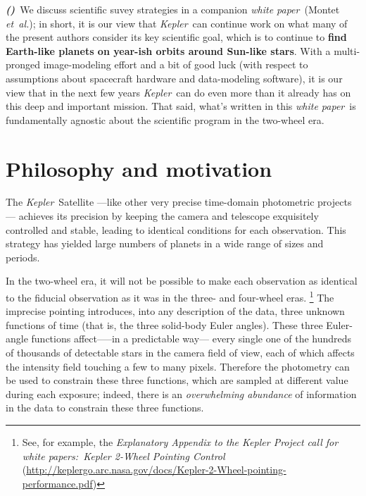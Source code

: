 \documentclass[letterpaper,12pt,whitepaper]{haastex}
\newcommand{\documentname}{\textsl{white paper}}
\newcommand{\foreign}[1]{\textit{#1}}
\newcommand{\etal}{\foreign{et~al.}}
\newcommand{\observatory}[1]{\textsl{#1}}
\newcommand{\Kepler}{\observatory{Kepler}}
\newcounter{inlineitem}
\newcommand{\binlineitem}{\refstepcounter{inlineitem}\textbf{\textsl{(\theinlineitem)}}}
\begin{document}
\binlineitem~We discuss scientific suvey strategies in a companion \documentname\ (Montet \etal);
  in short, it is our view that \Kepler\ can continue work on
  what many of the present authors consider its key scientific goal,
  which is to continue to \textbf{find Earth-like planets on year-ish orbits around Sun-like stars}.
With a multi-pronged image-modeling effort and
  a bit of good luck
  (with respect to assumptions about spacecraft hardware and data-modeling software),
  it is our view that in the next few years \Kepler\ can do even more
  than it already has on this deep and important mission.
That said, what's written in this \documentname\ is fundamentally
  agnostic about the scientific program in the two-wheel era.

\clearpage
\section{Philosophy and motivation}

The \Kepler\ Satellite%
  ---like other very precise time-domain photometric projects---%
  achieves its precision by keeping the camera and telescope exquisitely controlled and stable,
  leading to identical conditions for each observation.
This strategy has yielded large numbers of planets in a wide range of sizes and periods.

In the two-wheel era, it will not be possible
  to make each observation as identical to the fiducial observation
  as it was in the three- and four-wheel eras.%
  \footnote{See, for example, the \textit{Explanatory Appendix to the Kepler Project
      call for white papers:\ Kepler 2-Wheel Pointing Control}
    (\url{http://keplergo.arc.nasa.gov/docs/Kepler-2-Wheel-pointing-performance.pdf})}
The imprecise pointing introduces, into any description of the data, three unknown functions of time
  (that is, the three solid-body Euler angles).
These three Euler-angle functions affect—--in a predictable way---%
  every single one of the hundreds of thousands of detectable stars
  in the camera field of view,
  each of which affects the intensity field touching a few to many pixels.
Therefore the photometry can be used to constrain these three functions,
  which are sampled at different value during each exposure;
  indeed, there is an \emph{overwhelming abundance} of information in the data
  to constrain these three functions.
\end{document}
